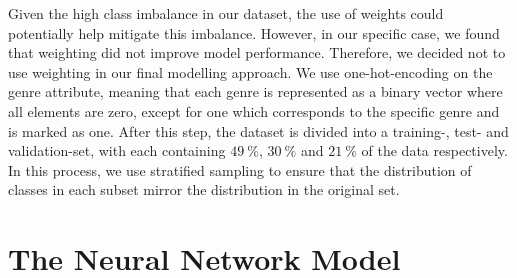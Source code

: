 \documentclass[
  12pt,
  bibliography=totoc,     %
  captions=tableheading,  %
  titlepage=firstiscover, %
]{scrartcl}
\begin{document}
Given the high class imbalance in our dataset, the use of weights could potentially help mitigate this imbalance. However, in our specific case, we found that weighting did not improve model performance. Therefore, we decided not to use weighting in our final modelling approach. We use one-hot-encoding on the genre attribute, meaning that each genre is represented as a binary vector where all elements are zero, except for one which corresponds to the specific genre and is marked as one.
After this step, the dataset is divided into a training-, test- and validation-set, with each containing $\SI{49}{\percent}$, $\SI{30}{\percent}$ and $\SI{21}{\percent}$
of the data respectively. In this process, we use stratified sampling to ensure that the distribution of classes in each subset mirror the distribution in the original
set.
\section{The Neural Network Model}
\end{document}
